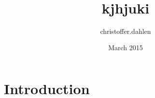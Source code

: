 \documentclass{article}
\title{kjhjuki}
\author{christoffer.dahlen }
\date{March 2015}
\begin{document}
\maketitle

\section{Introduction}
\end{document}
